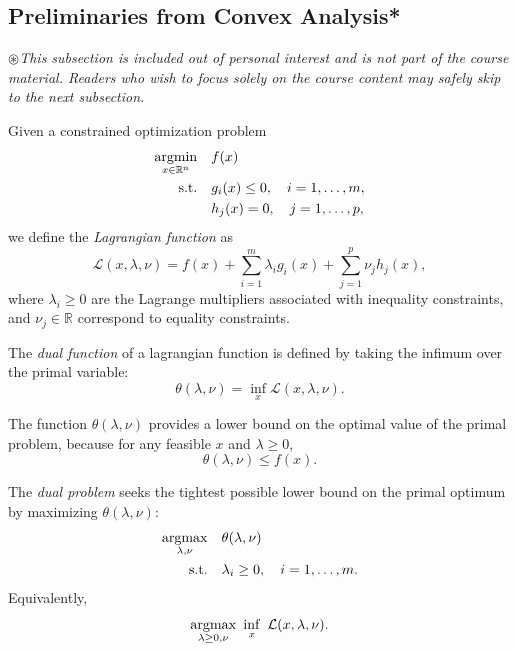 \documentclass[../main]{subfiles}
\begin{document}
\subsection{Preliminaries from Convex Analysis*}
\begin{tcolorbox}
    \vspace{0.5em}
        \color{red!50!black}$\circledast   $\quad\emph{{This subsection is included out of personal interest and is not part of the course material. 
        Readers who wish to focus solely on the course content may safely skip to the next subsection.}}
    \vspace{0.5em}
\end{tcolorbox}
Given a constrained optimization problem
\begin{equation}
\begin{aligned}
\mathop{\mathrm{argmin}}_{x \in \mathbb{R}^n} & \quad f(x) \\
\text{s.t.} & \quad g_i(x) \le 0, \quad i = 1,\dots,m,\\
& \quad h_j(x) = 0, \quad j = 1,\dots,p,
\end{aligned}
\end{equation}
we define the \emph{Lagrangian function} as
\begin{equation}
\mathcal{L}(x, \lambda, \nu)
= f(x) + \sum_{i=1}^{m} \lambda_i g_i(x)
  + \sum_{j=1}^{p} \nu_j h_j(x),
\end{equation}
where $\lambda_i \ge 0$ are the Lagrange multipliers associated with inequality constraints,
and $\nu_j \in \mathbb{R}$ correspond to equality constraints.
\begin{definition}
The \emph{dual function} of a lagrangian function is defined by taking the infimum over the primal variable:
\begin{equation}
\theta(\lambda, \nu) = \inf_{x} \mathcal{L}(x, \lambda, \nu).
\end{equation}
\end{definition}

The function $\theta(\lambda, \nu)$ provides a lower bound on the optimal value of the primal problem,
because for any feasible $x$ and $\lambda \ge 0$,
\begin{equation}
\theta(\lambda, \nu) \le f(x).
\end{equation}

\begin{definition}
The \emph{dual problem} seeks the tightest possible lower bound on the primal optimum by maximizing $\theta(\lambda, \nu)$:
\begin{equation}
\begin{aligned}
\mathop{\mathrm{argmax}}_{\lambda, \nu} \quad & \theta(\lambda, \nu) \\
\text{s.t.} \quad & \lambda_i \ge 0, \quad i = 1,\dots,m.
\end{aligned}
\end{equation}
Equivalently,
\begin{equation}
\argmax_{\lambda \ge 0, \nu}\ \inf_{x}\ \mathcal{L}(x,\lambda,\nu).
\end{equation}
\end{definition}
\end{document}
